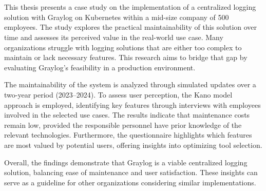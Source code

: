 \documentclass[../main.tex]{subfiles}
\begin{document}
\chapter*{\myAbstractTitle}

This thesis presents a case study on the implementation of a centralized logging solution with Graylog on Kubernetes within a mid-size company of 500 employees. The study explores the practical maintainability of this solution over time and assesses its perceived value in the real-world use case. Many organizations struggle with logging solutions that are either too complex to maintain or lack necessary features. This research aims to bridge that gap by evaluating Graylog’s feasibility in a production environment.

The maintainability of the system is analyzed through simulated updates over a two-year period (2023–2024). To assess user perception, the Kano model approach is employed, identifying key features through interviews with employees involved in the selected use cases. The results indicate that maintenance costs remain low, provided the responsible personnel have prior knowledge of the relevant technologies. Furthermore, the questionnaire highlights which features are most valued by potential users, offering insights into optimizing tool selection.

Overall, the findings demonstrate that Graylog is a viable centralized logging solution, balancing ease of maintenance and user satisfaction. These insights can serve as a guideline for other organizations considering similar implementations.
\end{document}
